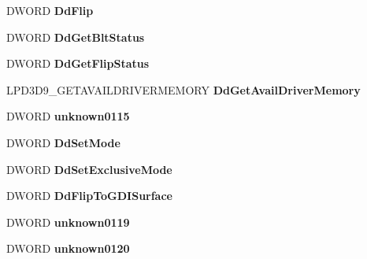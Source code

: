 \begin{DoxyCompactItemize}
D\+W\+O\+RD {\bfseries Dd\+Flip}
\item 
\mbox{\label{struct__tag_d3_d9___c_a_l_l_b_a_c_k_s_a018a5933ad9fe8626e55d1e5be985d92}} 
D\+W\+O\+RD {\bfseries Dd\+Get\+Blt\+Status}
\item 
\mbox{\label{struct__tag_d3_d9___c_a_l_l_b_a_c_k_s_a03d2973447fa10d57ad4dd0c34c1b40f}} 
D\+W\+O\+RD {\bfseries Dd\+Get\+Flip\+Status}
\item 
\mbox{\label{struct__tag_d3_d9___c_a_l_l_b_a_c_k_s_ae820f2e8ce985c6b7ca09226acf5fe36}} 
L\+P\+D3\+D9\+\_\+\+G\+E\+T\+A\+V\+A\+I\+L\+D\+R\+I\+V\+E\+R\+M\+E\+M\+O\+RY {\bfseries Dd\+Get\+Avail\+Driver\+Memory}
\item 
\mbox{\label{struct__tag_d3_d9___c_a_l_l_b_a_c_k_s_a9debc0707ed86c64c4f1cfa47b7f7923}} 
D\+W\+O\+RD {\bfseries unknown0115}
\item 
\mbox{\label{struct__tag_d3_d9___c_a_l_l_b_a_c_k_s_a8c85497b4d3c7e79fc5df85fe16fccd9}} 
D\+W\+O\+RD {\bfseries Dd\+Set\+Mode}
\item 
\mbox{\label{struct__tag_d3_d9___c_a_l_l_b_a_c_k_s_a8b79195aa7cd092f197c855965835b5d}} 
D\+W\+O\+RD {\bfseries Dd\+Set\+Exclusive\+Mode}
\item 
\mbox{\label{struct__tag_d3_d9___c_a_l_l_b_a_c_k_s_a2c33d50937187f2e095afb8d11f55746}} 
D\+W\+O\+RD {\bfseries Dd\+Flip\+To\+G\+D\+I\+Surface}
\item 
\mbox{\label{struct__tag_d3_d9___c_a_l_l_b_a_c_k_s_af26cd1cb7fd5c90436b2c890079240a2}} 
D\+W\+O\+RD {\bfseries unknown0119}
\item 
\mbox{\label{struct__tag_d3_d9___c_a_l_l_b_a_c_k_s_aeb60e050de17d25106bca15a86b05734}} 
D\+W\+O\+RD {\bfseries unknown0120}
\item 
\mbox{\label{struct__tag_d3_d9___c_a_l_l_b_a_c_k_s_a1cbb71dcda59980f210436fa58cb450d}} 

\end{DoxyCompactItemize}
